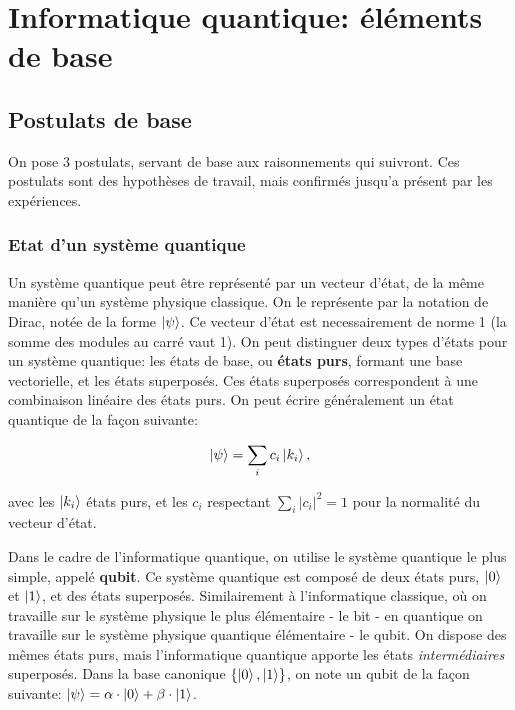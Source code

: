 \chapter{Informatique quantique: éléments de base}

\section{Postulats de base}

On pose 3 postulats, servant de base aux raisonnements qui suivront. Ces postulats sont des hypothèses de travail, mais confirmés jusqu'a présent par les expériences.

\subsection{Etat d'un système quantique}
Un système quantique peut être représenté par un vecteur d'état, de la même manière qu'un système physique classique. On le représente par la notation de Dirac, notée de la forme $\ket{\psi}$. Ce vecteur d'état est necessairement de norme 1 (la somme des modules au carré vaut 1). On peut distinguer deux types d'états pour un système quantique: les états de base, ou \textbf{états purs}, formant une base vectorielle, et les états superposés. Ces états superposés correspondent à une combinaison linéaire des états purs. On peut écrire généralement un état quantique de la façon suivante:

\begin{equation}
    \ket{\psi} = \displaystyle\sum_{i} c_i \ket{k_i},
\end{equation}

avec les $\ket{k_i}$ états purs, et les $c_i$ respectant $ \displaystyle\sum_{i} |c_i|^2 = 1$ pour la normalité du vecteur d'état.

\medbreak

Dans le cadre de l'informatique quantique, on utilise le système quantique le plus simple, appelé \textbf{qubit}. Ce système quantique est composé de deux états purs, $\ket{0}$ et $\ket{1}$, et des états superposés. Similairement à l'informatique classique, où on travaille sur le système physique le plus élémentaire - le bit - en quantique on travaille sur le système physique quantique élémentaire - le qubit. On dispose des mêmes états purs, mais l'informatique quantique apporte les états \textit{intermédiaires} superposés. Dans la base canonique $\{\ket{0}, \ket{1}\}$, on note un qubit de la façon suivante: $\ket{\psi} = \alpha \cdot \ket{0} + \beta \cdot \ket{1}$.

